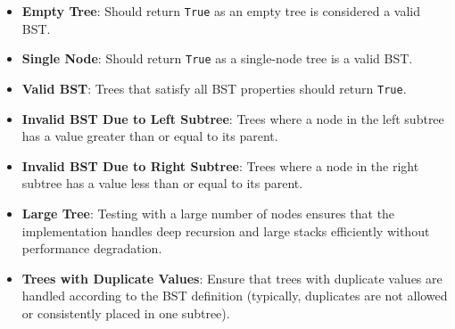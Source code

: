 \begin{itemize}
    \item \textbf{Empty Tree}: Should return \texttt{True} as an empty tree is considered a valid BST.
    \item \textbf{Single Node}: Should return \texttt{True} as a single-node tree is a valid BST.
    \item \textbf{Valid BST}: Trees that satisfy all BST properties should return \texttt{True}.
    \item \textbf{Invalid BST Due to Left Subtree}: Trees where a node in the left subtree has a value greater than or equal to its parent.
    \item \textbf{Invalid BST Due to Right Subtree}: Trees where a node in the right subtree has a value less than or equal to its parent.
    \item \textbf{Large Tree}: Testing with a large number of nodes ensures that the implementation handles deep recursion and large stacks efficiently without performance degradation.
    \item \textbf{Trees with Duplicate Values}: Ensure that trees with duplicate values are handled according to the BST definition (typically, duplicates are not allowed or consistently placed in one subtree).
\end{itemize}